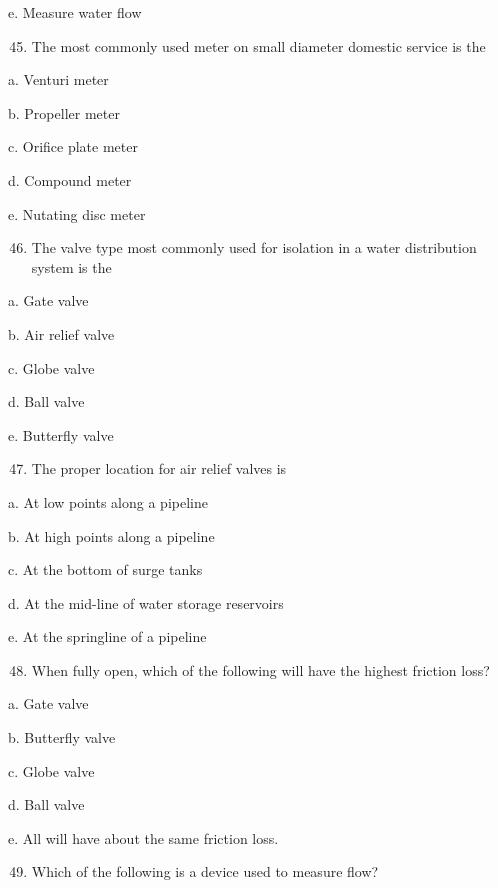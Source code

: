 \documentclass[10pt]{article}
\begin{document}
\begin{enumerate}
\begin{enumerate}
e. Measure water flow

\begin{enumerate}
  \setcounter{enumi}{44}
  \item The most commonly used meter on small diameter domestic service is the
\end{enumerate}

a. Venturi meter

b. Propeller meter

c. Orifice plate meter

d. Compound meter

e. Nutating disc meter

\begin{enumerate}
  \setcounter{enumi}{45}
  \item The valve type most commonly used for isolation in a water distribution system is the
\end{enumerate}

a. Gate valve

b. Air relief valve

c. Globe valve

d. Ball valve

e. Butterfly valve

\begin{enumerate}
  \setcounter{enumi}{46}
  \item The proper location for air relief valves is
\end{enumerate}

a. At low points along a pipeline

b. At high points along a pipeline

c. At the bottom of surge tanks

d. At the mid-line of water storage reservoirs

e. At the springline of a pipeline

\begin{enumerate}
  \setcounter{enumi}{47}
  \item When fully open, which of the following will have the highest friction loss?
\end{enumerate}

a. Gate valve

b. Butterfly valve

c. Globe valve

d. Ball valve

e. All will have about the same friction loss.

\begin{enumerate}
  \setcounter{enumi}{48}
  \item Which of the following is a device used to measure flow?
\end{enumerate}


\end{enumerate}
\end{enumerate}
\end{document}

